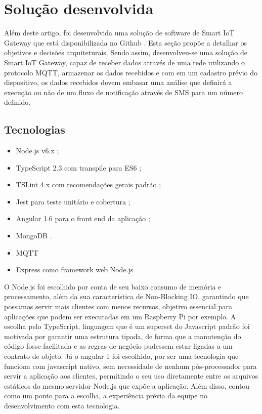 \section{Solução desenvolvida}
\label{sec:iotGateway}

Além deste artigo, foi desenvolvida uma solução de software de Smart IoT Gateway que está disponibilizada no Github \cite{IoTGatewayGithub}. Esta seção propõe a detalhar os objetivos e decisões arquiteturais. Sendo assim, desenvolveu-se uma solução de Smart IoT Gateway, capaz de receber dados através de uma rede utilizando o protocolo MQTT, armazenar os dados recebidos e com em um cadastro prévio do dispositivo, os dados recebidos devem embasar uma análise que definirá a execução ou não  de um fluxo de notificação através de SMS para um número definido.

\subsection{Tecnologias} 
\begin{itemize}
	\item Node.js v6.x \cite{NodeJS};
	\item TypeScript 2.3 com transpile para ES6 \cite{Typescript};
	\item TSLint 4.x com recomendações gerais padrão \cite{TSLint};
	\item Jest para teste unitário e cobertura \cite{Jest};
	\item Angular 1.6 para o front end da aplicação \cite{AngularJS};
	\item MongoDB \cite{MongoDB}.
	\item MQTT \cite{Mqtt}
	\item Express como framework web Node.js \cite{ExpressJS}
\end{itemize}

O Node.js foi escolhido por conta de seu baixo consumo de memória e processamento, além da sua característica de Non-Blocking IO, garantindo que possamos servir mais clientes com menos recursos, objetivo essencial para aplicações que podem ser executadas em um Raspberry Pi por exemplo. A escolha pelo TypeScript, linguagem que é um superset do Javascript padrão foi motivada por garantir uma estrutura tipada, de forma que a manutenção do código fosse facilitada e as regras de negócio pudessem estar ligadas a um contrato de objeto. Já o angular 1 foi escolhido, por ser uma tecnologia que funciona com javascript nativo, sem necessidade de nenhum pós-processador para servir a aplicação aos clientes, permitindo o seu uso diretamente entre os arquivos estáticos do mesmo servidor Node.js que expõe a aplicação. Além disso, contou como um ponto para a escolha, a experiência prévia da equipe no desenvolvimento com esta tecnologia.
